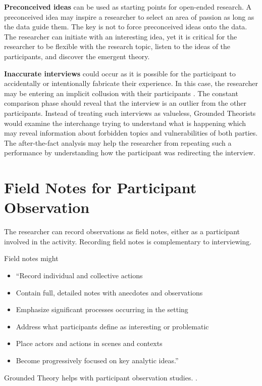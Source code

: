 \textbf{Preconceived ideas} can be used as starting points for open-ended research. A preconceived idea may inspire a researcher to select an area of passion as long as the data guide them. The key is not to force preconceived ideas onto the data. The researcher can initiate with an interesting idea, yet it is critical for the researcher to be flexible with the research topic, listen to the ideas of the participants, and discover the emergent theory. 

\textbf{Inaccurate interviews} could occur as it is possible for the participant to accidentally or intentionally fabricate their experience. In this case, the researcher may be entering an implicit collusion with their participants \cite{Yanos2008CollusiveObjectification}. The constant comparison phase should reveal that the interview is an outlier from the other participants.  Instead of treating such interviews as valueless, Grounded Theorists would examine the interchange trying to understand what is happening which may reveal information about forbidden topics and vulnerabilities of both parties. The after-the-fact analysis may help the researcher from repeating such a performance by understanding how the participant was redirecting the interview. 

\section{Field Notes for Participant Observation}
The researcher can record observations as field notes, either as a participant involved in the activity. Recording field notes is complementary to interviewing. 

Field notes might
\begin{itemize}
\item ``Record individual and collective actions 
\item Contain full, detailed notes with anecdotes and observations 
\item Emphasize significant processes occurring in the setting 
\item Address what participants define as interesting or problematic 
\item Place actors and actions in scenes and contexts 
\item Become progressively focused on key analytic ideas.'' \cite{Charmaz}
\end{itemize}

Grounded Theory helps with participant observation studies.  \cite{Charmaz}.

